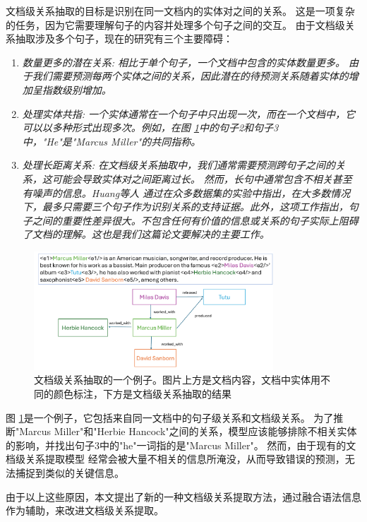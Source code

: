 \documentclass[bachelor]{thesis-uestc}
\begin{document}
文档级关系抽取的目标是识别在同一文档内的实体对之间的关系。
这是一项复杂的任务，因为它需要理解句子的内容并处理多个句子之间的交互。
由于文档级关系抽取涉及多个句子，现在的研究有三个主要障碍：
\begin{enumerate}
    \item \em{数量更多的潜在关系}: 相比于单个句子，一个文档中包含的实体数量更多。
    由于我们需要预测每两个实体之间的关系，因此潜在的待预测关系随着实体的增加呈指数级别增加。
    \item \em{处理实体共指}: 一个实体通常在一个句子中只出现一次，而在一个文档中，它可以以多种形式出现多次。例如，在图 \ref{fig_example}中的句子2和句子3中，"He"是"Marcus Miller"的共同指称。
    \item \em{处理长距离关系}: 在文档级关系抽取中，我们通常需要预测跨句子之间的关系，这可能会导致实体对之间距离过长。
    然而，长句中通常包含不相关甚至有噪声的信息。Huang等人 通过在众多数据集的实验中指出，在大多数情况下，最多只需要三个句子作为识别关系的支持证据。此外，这项工作指出，句子之间的重要性差异很大。不包含任何有价值的信息或关系的句子实际上阻碍了文档的理解。这也是我们这篇论文要解决的主要工作。
\end{enumerate}
\begin{figure}[h]
    \centering
    \includegraphics[width=0.8\textwidth]{misc/fig_example.pdf}
    \caption{文档级关系抽取的一个例子。图片上方是文档内容，文档中实体用不同的颜色标注，下方是文档级关系抽取的结果}
    \label{fig_example}
\end{figure}

图 \ref{fig_example}是一个例子，它包括来自同一文档中的句子级关系和文档级关系。
为了推断"Marcus Miller"和"Herbie Hancock"之间的关系，模型应该能够排除不相关实体的影响，并找出句子3中的"he"一词指的是"Marcus Miller"。
然而，由于现有的文档级关系提取模型 经常会被大量不相关的信息所淹没，从而导致错误的预测，无法捕捉到类似的关键信息。 \par

由于以上这些原因，本文提出了新的一种文档级关系提取方法，通过融合语法信息作为辅助，来改进文档级关系提取。\par
\end{document}
